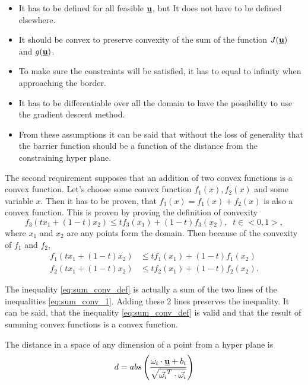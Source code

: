 \documentclass[a4paper,11pt,titlepage]{article}
\newcommand{\uvec}{\textbf{\underline{u}}}
\begin{document}
\begin{itemize}
\item It has to be defined for all feasible $\uvec$, but It does not have to be defined elsewhere.
\item It should be convex to preserve convexity of the sum of the function $J(\uvec)$ and $g(\uvec)$.
\item  To make sure the constraints will be satisfied, it has to equal to infinity when approaching the border.
\item It has to be differentiable over all the domain to have the possibility to use the gradient descent method.
\item From these assumptions it can be said that without the loss of generality that the barrier function should be a function of the distance from the constraining hyper plane.
\end{itemize}

The second requirement supposes that an addition of two convex functions is a convex function. Let's choose some convex function $f_1(x), f_2(x)$ and some variable $x$. Then it has to be proven, that $f_3(x) = f_1(x) + f_2(x)$ is also a convex function. This is proven by proving the definition of convexity 
\begin{equation}
\label{eq:sum_conv_def}
f_3(tx_1+(1-t)x_2) \leq tf_3(x_1) + (1-t)f_3(x_2), \;\; t  \in  <0, 1>,
\end{equation}
where $x_1$ and $x_2$ are any points form the domain. Then because of the convexity of $f_1$ and $f_2$,
\begin{equation}
\label{eq:sum_conv_1}
\begin{split}
f_1(tx_1+(1-t)x_2) &\leq tf_1(x_1) + (1-t)f_1(x_2)\\
f_2(tx_1+(1-t)x_2) &\leq tf_2(x_1) + (1-t)f_2(x_2).
\end{split}
\end{equation}

The inequality \ref{eq:sum_conv_def} is actually a sum of the two lines of the inequalities \ref{eq:sum_conv_1}. Adding these 2 lines preserves the inequality. It can be said, that the inequality \ref{eq:sum_conv_def} is valid and that the result of summing convex functions is a convex function. 

The distance in a space of any dimension of a point from a hyper plane is 
\begin{equation}
\label{eq:plane_distance}
d = abs\left(\frac{\omega_i \cdot \uvec + b_i}{\sqrt{\vec{\omega_i}^T \cdot \vec{\omega_i}}}\right)
\end{equation}
\end{document}
